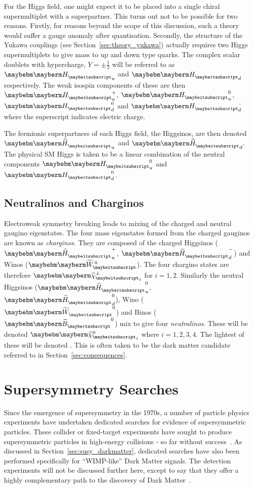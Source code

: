 For the Higgs field, one might expect it to be placed into a single chiral
supermultiplet with a \spinhalf superpartner. This turns out not to be possible
for two reasons. Firstly, for reasons beyond the scope of this discussion, such
a theory would suffer a gauge anomaly after quantisation. Secondly, the
structure of the Yukawa couplings (see Section~\ref{sec:theory_yukawa}) actually
requires two Higgs supermultiplets to give mass to up and down type quarks. The
complex scalar doublets with hypercharge, $Y=\pm\frac{1}{2}$ will be referred to
as $\PHiggs_u$ and $\PHiggs_d$ respectively. The weak isospin components of
these are then $\PHiggs_u^+$, $\PHiggs_u^0$, $\PHiggs_d^0$ and $\PHiggs_d^-$
where the superscript indicates electric charge.

The fermionic superpartners of each Higgs field, the Higgsinos, are then denoted
$\PSHiggs_u$ and $\PSHiggs_d$. The physical \ac{SM} Higgs is taken to be a
linear combination of the neutral components $\PHiggs_u^0$ and $\PHiggs_d^0$.




\subsection{Neutralinos and Charginos}
Electroweak symmetry breaking leads to mixing of the charged and neutral gaugino
eigenstates. The four mass eigenstates formed from the charged gauginos are
known as \emph{charginos}. They are composed of the charged Higgsinos
($\PSHiggs_u^+$, $\PSHiggs_d^-$) and Winos ($\PSWpm$). The four chargino states
are therefore $\PScharginopm_i$ for $i=1,2$. Similarly the neutral Higgsinos
($\PSHiggs_u^0$, $\PSHiggs_d^0$), Wino ($\PSW^0$) and Binos ($\PSB^0$) mix to
give four \emph{neutralinos}. These will be denoted $\PSneutralino_i$ where
$i=1,2,3,4$. The lightest of these will be denoted \PSneutralino. This is often
taken to be the dark matter candidate referred to in
Section~\ref{sec:consequences}.

\section{Supersymmetry Searches}
Since the emergence of supersymmetry in the 1970s, a number of particle physics
experiments have undertaken dedicated searches for evidence of supersymmetric
particles. These collider or fixed-target experiments have sought to produce
supersymmetric particles in high-energy collisions - so far without
success~\cite{ua1_susy, aleph_susy, d0_susy, hera_susy}. As discussed in
Section~\ref{sec:susy_darkmatter}, dedicated searches have also been performed
specifically for ``\ac{WIMP}-like'' Dark Matter signals. The detection
experiments will not be discussed further here, except to say that they offer a
highly complementary path to the discovery of Dark
Matter~\cite{mastercode_2011}.

